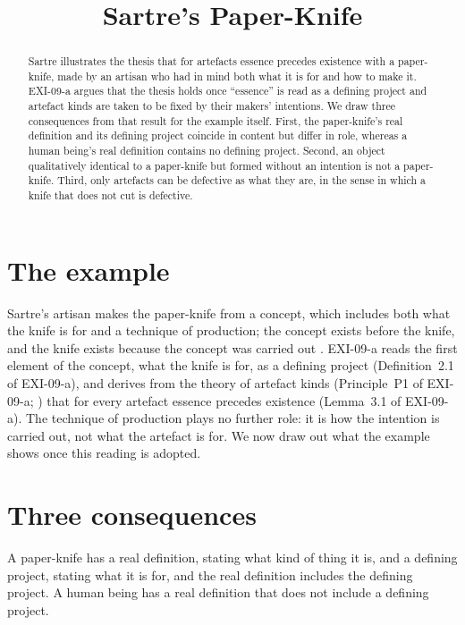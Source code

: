 \documentclass{situationist-preprint}
\title{Sartre's Paper-Knife}
\begin{document}
\maketitle

\begin{abstract}
Sartre illustrates the thesis that for artefacts essence precedes existence with a paper-knife, made by an artisan who had in mind both what it is for and how to make it. EXI-09-a argues that the thesis holds once \enquote{essence} is read as a defining project and artefact kinds are taken to be fixed by their makers' intentions. We draw three consequences from that result for the example itself. First, the paper-knife's real definition and its defining project coincide in content but differ in role, whereas a human being's real definition contains no defining project. Second, an object qualitatively identical to a paper-knife but formed without an intention is not a paper-knife. Third, only artefacts can be defective as what they are, in the sense in which a knife that does not cut is defective.
\end{abstract}

\section{The example}

Sartre's artisan makes the paper-knife from a concept, which includes both what the knife is for and a technique of production; the concept exists before the knife, and the knife exists because the concept was carried out \citep{Sartre1946}. EXI-09-a reads the first element of the concept, what the knife is for, as a defining project (Definition~2.1 of EXI-09-a), and derives from the theory of artefact kinds (Principle~P1 of EXI-09-a; \citealp{Hilpinen1992,Thomasson2003}) that for every artefact essence precedes existence (Lemma~3.1 of EXI-09-a). The technique of production plays no further role: it is how the intention is carried out, not what the artefact is for. We now draw out what the example shows once this reading is adopted.

\section{Three consequences}

\begin{proposition}\label{p:two}
A paper-knife has a real definition, stating what kind of thing it is, and a defining project, stating what it is for, and the real definition includes the defining project. A human being has a real definition that does not include a defining project.
\end{proposition}
\end{document}
